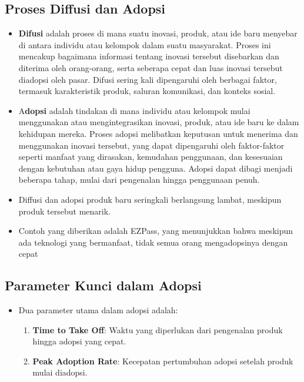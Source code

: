 \documentclass{article}
\begin{document}
\subsection{Proses Diffusi dan Adopsi}
\begin{itemize}
    \item \textbf{Difusi} adalah proses di mana suatu inovasi, produk, atau ide baru menyebar di antara individu atau kelompok dalam suatu masyarakat. Proses ini mencakup bagaimana informasi tentang inovasi tersebut disebarkan dan diterima oleh orang-orang, serta seberapa cepat dan luas inovasi tersebut diadopsi oleh pasar. Difusi sering kali dipengaruhi oleh berbagai faktor, termasuk karakteristik produk, saluran komunikasi, dan konteks sosial.
    \item  A\textbf{dopsi} adalah tindakan di mana individu atau kelompok mulai menggunakan atau mengintegrasikan inovasi, produk, atau ide baru ke dalam kehidupan mereka. Proses adopsi melibatkan keputusan untuk menerima dan menggunakan inovasi tersebut, yang dapat dipengaruhi oleh faktor-faktor seperti manfaat yang dirasakan, kemudahan penggunaan, dan kesesuaian dengan kebutuhan atau gaya hidup pengguna. Adopsi dapat dibagi menjadi beberapa tahap, mulai dari pengenalan hingga penggunaan penuh.
    \item Diffusi dan adopsi produk baru seringkali berlangsung lambat, meskipun produk tersebut menarik.
    \item Contoh yang diberikan adalah EZPass, yang menunjukkan bahwa meskipun ada teknologi yang bermanfaat, tidak semua orang mengadopsinya dengan cepat
\end{itemize}

\subsection{Parameter Kunci dalam Adopsi}
\begin{itemize}
    \item Dua parameter utama dalam adopsi adalah:
          \begin{enumerate}
              \item \textbf{Time to Take Off}: Waktu yang diperlukan dari pengenalan produk hingga adopsi yang cepat.
              \item \textbf{Peak Adoption Rate}: Kecepatan pertumbuhan adopsi setelah produk mulai diadopsi.
          \end{enumerate}
\end{itemize}
\end{document}
